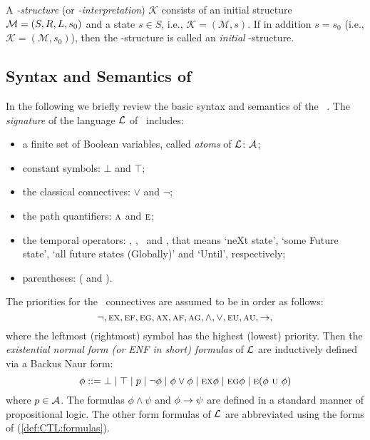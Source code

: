 \documentclass{article}
\begin{document}
A {\em \MPK-structure} (or {\em \MPK-interpretation}) $\mathcal{K}$ consists of an initial structure
${\cal M}=(S, R, L, s_0)$ and a state $s\in S$, i.e.,  $\mathcal{K} = (\mathcal{M}, s)$.
If in addition $s=s_0$ (i.e., $\mathcal{K} = (\mathcal{M}, s_0)$), then the \MPK-structure is called an {\em initial} \MPK-structure.


\subsection{Syntax and Semantics of \CTL}
In the following we briefly review the basic syntax and semantics
of the \CTL~\cite{DBLP:journals/toplas/ClarkeES86}.
The {\em signature} of the language $\cal L$ of \CTL\ includes:
\begin{itemize}
  \item a finite set of Boolean variables, called {\em atoms} of $\cal L$: $\cal A$;
  \item constant symbols: $\bot$ and $\top$;
  \item the classical connectives: $\lor$ and $\neg$;
  \item the path quantifiers: $\textsc{a}$ and $\textsc{e}$;
  \item the temporal operators: \NEXT, \FUTURE, \GLOBAL\ and \UNTIL, that
  means `neXt state', `some Future state', `all future states (Globally)' and `Until', respectively;
  \item parentheses: ( and ).
\end{itemize}

The priorities for the \CTL\ connectives are assumed to be in order as follows:
\begin{equation*}
  \neg, \textsc{e}\textsc{x}, \textsc{e}\textsc{f}, \textsc{e}\textsc{g}, \textsc{a}\textsc{x}, \textsc{a}\textsc{f}, \textsc{a}\textsc{g}
 ,\land, \lor, \textsc{e}\textsc{u}, \textsc{a}\textsc{u}, \rightarrow,
\end{equation*}
where the leftmost (rightmost) symbol has the highest (lowest) priority.
Then the {\em existential normal form (or ENF in short) formulas} of
$\cal L$ are inductively defined via a Backus Naur form:
\begin{equation}\label{def:CTL:formulas}
  \phi ::=  \bot \mid \top \mid p \mid\neg\phi \mid \phi\lor\phi \mid
    \EXIST \NEXT \phi \mid
    \EXIST \GLOBAL \phi \mid
    \EXIST (\phi\ \UNTIL\ \phi)%
\end{equation}
where $p\in\cal A$. The formulas $\phi\land\psi$ and $\phi\rightarrow\psi$
are defined in a standard manner of propositional logic.
The other form formulas of $\cal L$ are abbreviated
using the forms of (\ref{def:CTL:formulas}).
\end{document}
